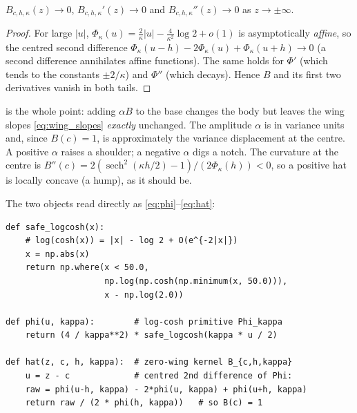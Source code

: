 \documentclass[11pt]{article}
\begin{document}
\begin{lemma}
\label{lem:zerowing}
$B_{c,h,\kappa}(z)\to0$, $B_{c,h,\kappa}'(z)\to0$ and $B_{c,h,\kappa}''(z)\to0$
as $z\to\pm\infty$.
\end{lemma}

\begin{proof}
For large $|u|$, $\Phi_\kappa(u)=\tfrac{2}{\kappa}|u|-\tfrac{4}{\kappa^2}\log2+o(1)$
is asymptotically \emph{affine}, so the centred second difference
$\Phi_\kappa(u-h)-2\Phi_\kappa(u)+\Phi_\kappa(u+h)\to0$ (a second difference
annihilates affine functions). The same holds for $\Phi'$ (which tends to the
constants $\pm2/\kappa$) and $\Phi''$ (which decays). Hence $B$ and its first two
derivatives vanish in both tails.
\end{proof}

 is the whole point: adding $\alpha B$ to the base changes the
body but leaves the wing slopes \eqref{eq:wing_slopes} \emph{exactly} unchanged.
The amplitude $\alpha$ is in variance units and, since $B(c)=1$, is approximately
the variance displacement at the centre. A positive $\alpha$ raises a shoulder; a
negative $\alpha$ digs a notch. The curvature at the centre is
$B''(c)=2(\operatorname{sech}^2(\kappa h/2)-1)/(2\Phi_\kappa(h))<0$, so a positive
hat is locally concave (a hump), as it should be.

The two objects read directly as \eqref{eq:phi}--\eqref{eq:hat}:

\begin{lstlisting}[caption={The primitive $\Phi_\kappa$ and the zero-wing hat
$B_{c,h,\kappa}$ --- the production tail handling verbatim
(\texttt{models/sigmoid/kernels.py}): past $|x|=50$ the log-cosh SWITCHES to
its exact linear asymptote $|x|-\log2$; clipping $x$ instead would freeze
$\Phi$ constant in the far tail and destroy the wing slopes.},label={lst:hat}]
def safe_logcosh(x):
    # log(cosh(x)) = |x| - log 2 + O(e^{-2|x|})
    x = np.abs(x)
    return np.where(x < 50.0,
                    np.log(np.cosh(np.minimum(x, 50.0))),
                    x - np.log(2.0))

def phi(u, kappa):        # log-cosh primitive Phi_kappa
    return (4 / kappa**2) * safe_logcosh(kappa * u / 2)

def hat(z, c, h, kappa):  # zero-wing kernel B_{c,h,kappa}
    u = z - c             # centred 2nd difference of Phi:
    raw = phi(u-h, kappa) - 2*phi(u, kappa) + phi(u+h, kappa)
    return raw / (2 * phi(h, kappa))   # so B(c) = 1
\end{lstlisting}
\end{document}
